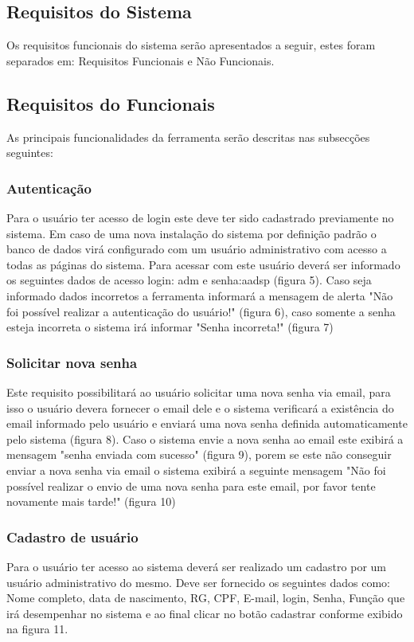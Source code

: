 \documentclass{acm_proc_article-sp}
\begin{document}
\subsection{Requisitos do Sistema}
Os requisitos funcionais do sistema serão apresentados a seguir, estes foram separados em: Requisitos Funcionais e Não Funcionais.

\subsection{Requisitos do Funcionais}
As principais funcionalidades da ferramenta serão descritas
nas subsecções seguintes:

\subsubsection{Autenticação}
Para o usuário ter acesso de login este deve ter sido cadastrado previamente no sistema. Em caso de uma nova instalação do sistema por definição padrão o banco de dados virá configurado com um usuário administrativo com  acesso a todas as páginas do sistema. Para acessar com este usuário deverá ser informado os seguintes dados de acesso login: adm e senha:aadsp (figura 5). Caso seja informado dados incorretos a ferramenta informará a mensagem de alerta "Não foi possível realizar a autenticação do usuário!" (figura 6), caso somente a senha esteja incorreta o sistema irá informar "Senha incorreta!" (figura 7)

\subsubsection{Solicitar nova senha}
Este requisito possibilitará ao usuário solicitar uma nova senha via email, para isso o usuário devera fornecer o email dele e o sistema verificará a existência do email informado pelo usuário e enviará uma nova senha definida automaticamente pelo sistema (figura 8). Caso o sistema envie a nova senha ao email este exibirá a mensagem "senha enviada com sucesso" (figura 9), porem se este não conseguir enviar a nova senha via email o sistema exibirá a seguinte mensagem "Não foi possível realizar o envio de uma nova senha para este email, por favor tente novamente mais tarde!" (figura 10)

\subsubsection{Cadastro de usuário}
Para o usuário ter acesso ao sistema deverá ser realizado um cadastro por um usuário administrativo do mesmo. Deve ser fornecido os seguintes dados como: Nome completo, data de nascimento, RG, CPF, E-mail, login, Senha, Função que irá desempenhar no sistema e ao final clicar no botão cadastrar conforme exibido na figura 11.
\end{document}
